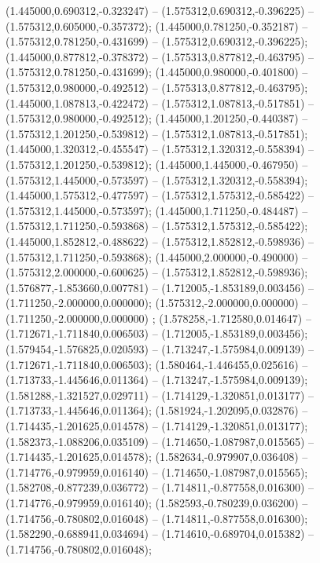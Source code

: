  (1.445000,0.690312,-0.323247) -- (1.575312,0.690312,-0.396225) -- (1.575312,0.605000,-0.357372);
 (1.445000,0.781250,-0.352187) -- (1.575312,0.781250,-0.431699) -- (1.575312,0.690312,-0.396225);
 (1.445000,0.877812,-0.378372) -- (1.575313,0.877812,-0.463795) -- (1.575312,0.781250,-0.431699);
 (1.445000,0.980000,-0.401800) -- (1.575312,0.980000,-0.492512) -- (1.575313,0.877812,-0.463795);
 (1.445000,1.087813,-0.422472) -- (1.575312,1.087813,-0.517851) -- (1.575312,0.980000,-0.492512);
 (1.445000,1.201250,-0.440387) -- (1.575312,1.201250,-0.539812) -- (1.575312,1.087813,-0.517851);
 (1.445000,1.320312,-0.455547) -- (1.575312,1.320312,-0.558394) -- (1.575312,1.201250,-0.539812);
 (1.445000,1.445000,-0.467950) -- (1.575312,1.445000,-0.573597) -- (1.575312,1.320312,-0.558394);
 (1.445000,1.575312,-0.477597) -- (1.575312,1.575312,-0.585422) -- (1.575312,1.445000,-0.573597);
 (1.445000,1.711250,-0.484487) -- (1.575312,1.711250,-0.593868) -- (1.575312,1.575312,-0.585422);
 (1.445000,1.852812,-0.488622) -- (1.575312,1.852812,-0.598936) -- (1.575312,1.711250,-0.593868);
 (1.445000,2.000000,-0.490000) -- (1.575312,2.000000,-0.600625) -- (1.575312,1.852812,-0.598936);
 (1.576877,-1.853660,0.007781) -- (1.712005,-1.853189,0.003456) -- (1.711250,-2.000000,0.000000);
 (1.575312,-2.000000,0.000000) -- (1.711250,-2.000000,0.000000) ;
 (1.578258,-1.712580,0.014647) -- (1.712671,-1.711840,0.006503) -- (1.712005,-1.853189,0.003456);
 (1.579454,-1.576825,0.020593) -- (1.713247,-1.575984,0.009139) -- (1.712671,-1.711840,0.006503);
 (1.580464,-1.446455,0.025616) -- (1.713733,-1.445646,0.011364) -- (1.713247,-1.575984,0.009139);
 (1.581288,-1.321527,0.029711) -- (1.714129,-1.320851,0.013177) -- (1.713733,-1.445646,0.011364);
 (1.581924,-1.202095,0.032876) -- (1.714435,-1.201625,0.014578) -- (1.714129,-1.320851,0.013177);
 (1.582373,-1.088206,0.035109) -- (1.714650,-1.087987,0.015565) -- (1.714435,-1.201625,0.014578);
 (1.582634,-0.979907,0.036408) -- (1.714776,-0.979959,0.016140) -- (1.714650,-1.087987,0.015565);
 (1.582708,-0.877239,0.036772) -- (1.714811,-0.877558,0.016300) -- (1.714776,-0.979959,0.016140);
 (1.582593,-0.780239,0.036200) -- (1.714756,-0.780802,0.016048) -- (1.714811,-0.877558,0.016300);
 (1.582290,-0.688941,0.034694) -- (1.714610,-0.689704,0.015382) -- (1.714756,-0.780802,0.016048);
